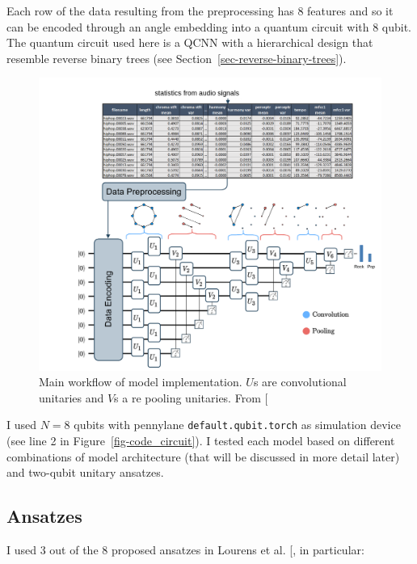 \documentclass[
  13pt,
  a4paper,
  DIV=11,
  numbers=noendperiod]{scrreprt}
\begin{document}
Each row of the data resulting from the preprocessing has 8 features and
so it can be encoded through an angle embedding into a quantum circuit
with 8 qubit. The quantum circuit used here is a QCNN with a
hierarchical design that resemble reverse binary trees (see
Section~\ref{sec-reverse-binary-trees}).

\begin{figure}[H]

{\centering \includegraphics{chapters/../img/workflow.png}

}

\caption{Main workflow of model implementation. \(U\)s are convolutional
unitaries and \(V\)s a re pooling unitaries. From
{[}\citeproc{ref-lourens2023hierarchical}{1}{]}}

\end{figure}%

I used \(N = 8\) qubits with pennylane \texttt{default.qubit.torch} as
simulation device (see line 2 in Figure~\ref{fig-code_circuit}). I
tested each model based on different combinations of model architecture
(that will be discussed in more detail later) and two-qubit unitary
ansatzes.

\subsection{Ansatzes}\label{ansatzes}

I used 3 out of the 8 proposed ansatzes in Lourens et al.
{[}\citeproc{ref-lourens2023hierarchical}{1}{]}, in particular:
\end{document}
